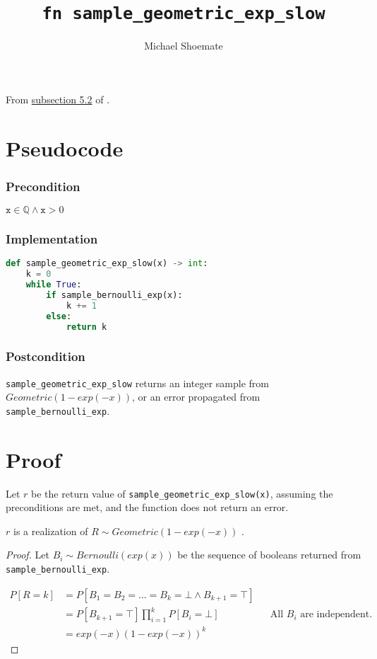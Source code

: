 \documentclass{article}
\title{\texttt{fn sample\_geometric\_exp\_slow}}
\author{Michael Shoemate}
\begin{document}
\maketitle

From \href{https://arxiv.org/pdf/2004.00010.pdf#subsection.5.2}{subsection 5.2} of \cite{CKS20}.

\section{Pseudocode}
\subsubsection*{Precondition}
$\texttt{x} \in \mathbb{Q} \land \texttt{x} > 0$

\subsubsection*{Implementation}        
\begin{lstlisting}[language=Python]
def sample_geometric_exp_slow(x) -> int:
    k = 0
    while True:
        if sample_bernoulli_exp(x):
            k += 1
        else:
            return k
\end{lstlisting}

\subsubsection*{Postcondition}
\texttt{sample\_geometric\_exp\_slow} returns an integer sample from $Geometric(1 - exp(-x))$, or an error propagated from \texttt{sample\_bernoulli\_exp}.

\section{Proof}
Let $r$ be the return value of \texttt{sample\_geometric\_exp\_slow(x)}, assuming the preconditions are met, and the function does not return an error.

\begin{theorem}
$r$ is a realization of $R \sim Geometric(1 - exp(-x))$ \cite{CKS20}.
\end{theorem}

\begin{proof}

Let $B_i \sim Bernoulli(exp(x))$ be the sequence of booleans returned from \texttt{sample\_bernoulli\_exp}.

\begin{align*}
    P[R = k] &= P[B_1 = B_2 = ... = B_k = \bot \land B_{k + 1} = \top] \\
    &= P[B_{k + 1} = \top] \prod_{i=1}^{k} P[B_i = \bot] && \text{All $B_i$ are independent.} \\
    &= exp(-x) (1 - exp(-x))^{k}
\end{align*}
\end{proof}




\end{document}
